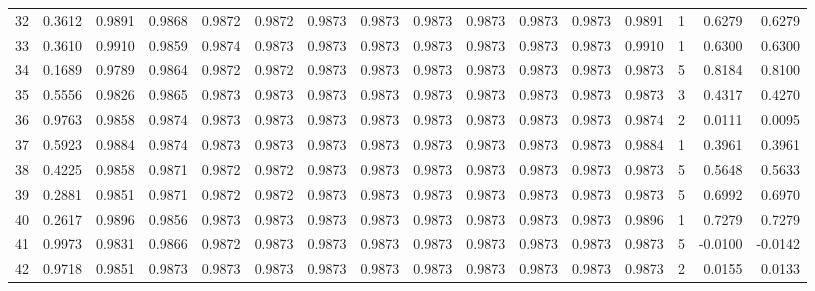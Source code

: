 \begin{tabular}{lrrrrrrrrrrrrrrr}
32  &      0.3612 &  0.9891 &  0.9868 &  0.9872 &  0.9872 &  0.9873 &  0.9873 &  0.9873 &  0.9873 &  0.9873 &   0.9873 &     0.9891 &      1 &                    0.6279 &                     0.6279 \\
33  &      0.3610 &  0.9910 &  0.9859 &  0.9874 &  0.9873 &  0.9873 &  0.9873 &  0.9873 &  0.9873 &  0.9873 &   0.9873 &     0.9910 &      1 &                    0.6300 &                     0.6300 \\
34  &      0.1689 &  0.9789 &  0.9864 &  0.9872 &  0.9872 &  0.9873 &  0.9873 &  0.9873 &  0.9873 &  0.9873 &   0.9873 &     0.9873 &      5 &                    0.8184 &                     0.8100 \\
35  &      0.5556 &  0.9826 &  0.9865 &  0.9873 &  0.9873 &  0.9873 &  0.9873 &  0.9873 &  0.9873 &  0.9873 &   0.9873 &     0.9873 &      3 &                    0.4317 &                     0.4270 \\
36  &      0.9763 &  0.9858 &  0.9874 &  0.9873 &  0.9873 &  0.9873 &  0.9873 &  0.9873 &  0.9873 &  0.9873 &   0.9873 &     0.9874 &      2 &                    0.0111 &                     0.0095 \\
37  &      0.5923 &  0.9884 &  0.9874 &  0.9873 &  0.9873 &  0.9873 &  0.9873 &  0.9873 &  0.9873 &  0.9873 &   0.9873 &     0.9884 &      1 &                    0.3961 &                     0.3961 \\
38  &      0.4225 &  0.9858 &  0.9871 &  0.9872 &  0.9872 &  0.9873 &  0.9873 &  0.9873 &  0.9873 &  0.9873 &   0.9873 &     0.9873 &      5 &                    0.5648 &                     0.5633 \\
39  &      0.2881 &  0.9851 &  0.9871 &  0.9872 &  0.9872 &  0.9873 &  0.9873 &  0.9873 &  0.9873 &  0.9873 &   0.9873 &     0.9873 &      5 &                    0.6992 &                     0.6970 \\
40  &      0.2617 &  0.9896 &  0.9856 &  0.9873 &  0.9873 &  0.9873 &  0.9873 &  0.9873 &  0.9873 &  0.9873 &   0.9873 &     0.9896 &      1 &                    0.7279 &                     0.7279 \\
41  &      0.9973 &  0.9831 &  0.9866 &  0.9872 &  0.9873 &  0.9873 &  0.9873 &  0.9873 &  0.9873 &  0.9873 &   0.9873 &     0.9873 &      5 &                   -0.0100 &                    -0.0142 \\
42  &      0.9718 &  0.9851 &  0.9873 &  0.9873 &  0.9873 &  0.9873 &  0.9873 &  0.9873 &  0.9873 &  0.9873 &   0.9873 &     0.9873 &      2 &                    0.0155 &                     0.0133 \\

\end{tabular}
